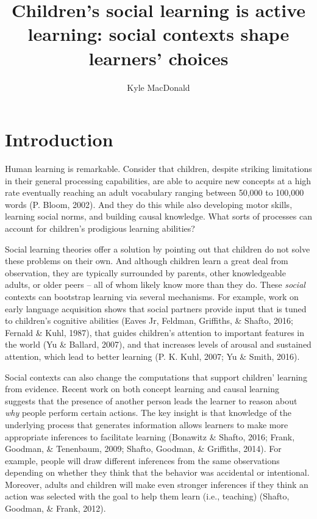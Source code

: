 \documentclass[a4paper,man,apacite,floatsintext]{apa6}
\date{}
\title{\textbf{Children's social learning is active learning: social contexts shape
learners' choices}}
\author{Kyle MacDonald}
\affiliation{Department of Psychology, Stanford University}
\begin{document}
\maketitle

\section{Introduction}\label{introduction}

Human learning is remarkable. Consider that children, despite striking
limitations in their general processing capabilities, are able to
acquire new concepts at a high rate eventually reaching an adult
vocabulary ranging between 50,000 to 100,000 words (P. Bloom, 2002). And
they do this while also developing motor skills, learning social norms,
and building causal knowledge. What sorts of processes can account for
children's prodigious learning abilities?

Social learning theories offer a solution by pointing out that children
do not solve these problems on their own. And although children learn a
great deal from observation, they are typically surrounded by parents,
other knowledgeable adults, or older peers -- all of whom likely know
more than they do. These \emph{social} contexts can bootstrap learning
via several mechanisms. For example, work on early language acquisition
shows that social partners provide input that is tuned to children's
cognitive abilities (Eaves Jr, Feldman, Griffiths, \& Shafto, 2016;
Fernald \& Kuhl, 1987), that guides children's attention to important
features in the world (Yu \& Ballard, 2007), and that increases levels
of arousal and sustained attention, which lead to better learning (P. K.
Kuhl, 2007; Yu \& Smith, 2016).

Social contexts can also change the computations that support children'
learning from evidence. Recent work on both concept learning and causal
learning suggests that the presence of another person leads the learner
to reason about \emph{why} people perform certain actions. The key
insight is that knowledge of the underlying process that generates
information allows learners to make more appropriate inferences to
facilitate learning (Bonawitz \& Shafto, 2016; Frank, Goodman, \&
Tenenbaum, 2009; Shafto, Goodman, \& Griffiths, 2014). For example,
people will draw different inferences from the same observations
depending on whether they think that the behavior was accidental or
intentional. Moreover, adults and children will make even stronger
inferences if they think an action was selected with the goal to help
them learn (i.e., teaching) (Shafto, Goodman, \& Frank, 2012).
\end{document}
